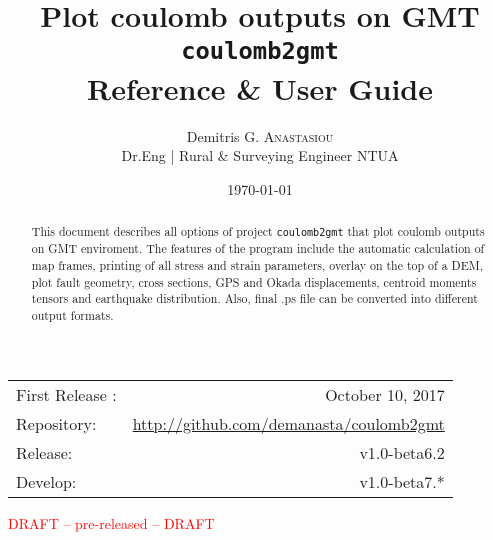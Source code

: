 \documentclass{article}
\title{\vskip 3cm Plot coulomb outputs on GMT \texttt{coulomb2gmt} \\ \large{Reference \& User Guide} } %
\author{Demitris G. \textsc{Anastasiou} \\ \normalsize{Dr.Eng | Rural \& Surveying Engineer NTUA} } %
\date{\today} %
\begin{document}
\maketitle %
\begin{center}
\vskip 1cm
\begin{tabular}{l r}
First Release : & October 10, 2017 \\
Repository:    & \url{http://github.com/demanasta/coulomb2gmt} \\
Release:        & v1.0-beta6.2\\
Develop:        & v1.0-beta7.*\\
\end{tabular}
\end{center}
\vfill
\begin{center}
\textcolor{red}{\huge DRAFT -- pre-released -- DRAFT}
\end{center}
\vfill
\begin{abstract}
{\small 
This document describes all options of project \texttt{coulomb2gmt} that plot 
coulomb outputs on GMT enviroment. Τhe features of the program include the 
automatic calculation of map frames, printing of all stress and strain parameters,
overlay on the top of a DEM, plot fault geometry, cross sections, GPS and Okada 
displacements, centroid moments tensors and earthquake distribution. Also, final 
.ps file can be converted into different output formats.
}
\end{abstract}
\clearpage

\tableofcontents
\clearpage


\end{document}
